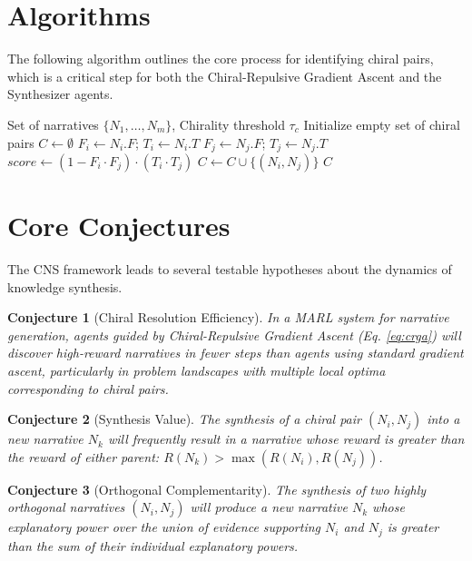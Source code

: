 \documentclass[12pt, a4paper]{article}
\newtheorem{conjecture}{Conjecture}
\begin{document}
\section{Algorithms}
The following algorithm outlines the core process for identifying chiral pairs, which is a critical step for both the Chiral-Repulsive Gradient Ascent and the Synthesizer agents.

\begin{algorithm}[H]
\caption{Chiral Pair Identification}
\label{alg:cpi}
\begin{algorithmic}[1]
\Require Set of narratives $\{N_1, \dots, N_m\}$, Chirality threshold $\tau_c$
\State Initialize empty set of chiral pairs $C \gets \emptyset$
        \State $F_i \gets N_i.F$; $T_i \gets N_i.T$
        \State $F_j \gets N_j.F$; $T_j \gets N_j.T$
        \State $score \gets (1 - F_i \cdot F_j) \cdot (T_i \cdot T_j)$ 
            \State $C \gets C \cup \{(N_i, N_j)\}$
        \EndIf
    \EndFor
\EndFor
\State \Return $C$
\end{algorithmic}
\end{algorithm}

\section{Core Conjectures}
The CNS framework leads to several testable hypotheses about the dynamics of knowledge synthesis.

\begin{conjecture}[Chiral Resolution Efficiency]
In a MARL system for narrative generation, agents guided by Chiral-Repulsive Gradient Ascent (Eq. \ref{eq:crga}) will discover high-reward narratives in fewer steps than agents using standard gradient ascent, particularly in problem landscapes with multiple local optima corresponding to chiral pairs.
\end{conjecture}

\begin{conjecture}[Synthesis Value]
The synthesis of a chiral pair $(N_i, N_j)$ into a new narrative $N_k$ will frequently result in a narrative whose reward is greater than the reward of either parent: $R(N_k) > \max(R(N_i), R(N_j))$.
\end{conjecture}

\begin{conjecture}[Orthogonal Complementarity]
The synthesis of two highly orthogonal narratives $(N_i, N_j)$ will produce a new narrative $N_k$ whose explanatory power over the union of evidence supporting $N_i$ and $N_j$ is greater than the sum of their individual explanatory powers.
\end{conjecture}
\end{document}
